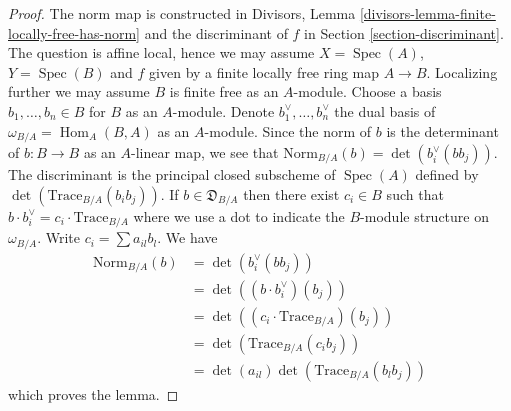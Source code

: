 \documentclass[10pt,a4paper]{amsart}
\theoremstyle{plain}
\theoremstyle{definition}
\theoremstyle{remark}
\numberwithin{equation}{subsection}
\def\Spec{\mathop{\mathrm{Spec}}}
\def\Hom{\mathop{\mathrm{Hom}}\nolimits}
\begin{document}
\begin{proof}
The norm map is constructed in
Divisors, Lemma \ref{divisors-lemma-finite-locally-free-has-norm}
and the discriminant of $f$ in Section \ref{section-discriminant}.
The question is affine local, hence we may assume $X = \Spec(A)$,
$Y = \Spec(B)$ and $f$ given by a finite locally free ring map $A \to B$.
Localizing further we may assume $B$ is finite free as an $A$-module.
Choose a basis $b_1, \ldots, b_n \in B$ for $B$ as an $A$-module.
Denote $b_1^\vee, \ldots, b_n^\vee$ the dual basis of
$\omega_{B/A} = \Hom_A(B, A)$ as an $A$-module.
Since the norm of $b$ is the determinant of $b : B \to B$ as an
$A$-linear map, we see that
$\text{Norm}_{B/A}(b) = \det(b_i^\vee(bb_j))$.
The discriminant is the principal closed subscheme of $\Spec(A)$
defined by $\det(\text{Trace}_{B/A}(b_ib_j))$.
If $b \in \mathfrak{D}_{B/A}$ then
there exist $c_i \in B$ such that
$b \cdot b_i^\vee = c_i \cdot \text{Trace}_{B/A}$ where
we use a dot to indicate the $B$-module structure on $\omega_{B/A}$.
Write $c_i = \sum a_{il} b_l$.
We have
\begin{align*}
\text{Norm}_{B/A}(b)
& =
\det(b_i^\vee(bb_j)) \\
& =
\det( (b \cdot b_i^\vee)(b_j)) \\
& =
\det((c_i \cdot \text{Trace}_{B/A})(b_j)) \\
& =
\det(\text{Trace}_{B/A}(c_ib_j)) \\
& =
\det(a_{il}) \det(\text{Trace}_{B/A}(b_l b_j))
\end{align*}
which proves the lemma.
\end{proof}
\end{document}
